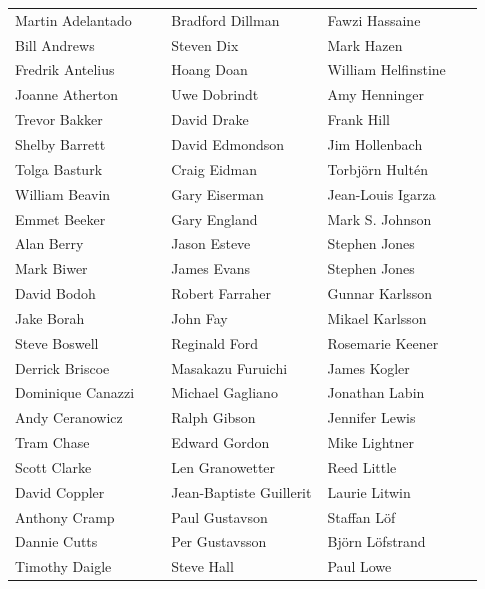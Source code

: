 {\fontsize{8.15}{9.15}\selectfont
\renewcommand{\arraystretch}{0.98}
    \begin{tabular}{@{}Y{0.31\linewidth}Y{0.31\linewidth}Y{0.31\linewidth}@{}}
        Martin Adelantado & Bradford Dillman        & Fawzi Hassaine      \\
        Bill Andrews      & Steven Dix              & Mark Hazen          \\
        Fredrik Antelius  & Hoang Doan              & William Helfinstine \\
        Joanne Atherton   & Uwe Dobrindt            & Amy Henninger       \\
        Trevor Bakker     & David Drake             & Frank Hill          \\
        Shelby Barrett    & David Edmondson         & Jim Hollenbach      \\
        Tolga Basturk     & Craig Eidman            & Torbjörn Hultén     \\
        William Beavin    & Gary Eiserman           & Jean-Louis Igarza   \\
        Emmet Beeker      & Gary England            & Mark S. Johnson     \\
        Alan Berry        & Jason Esteve            & Stephen Jones       \\
        Mark Biwer        & James Evans             & Stephen Jones       \\
        David Bodoh       & Robert Farraher         & Gunnar Karlsson     \\
        Jake Borah        & John Fay                & Mikael Karlsson     \\
        Steve Boswell     & Reginald Ford           & Rosemarie Keener    \\
        Derrick Briscoe   & Masakazu Furuichi       & James Kogler        \\
        Dominique Canazzi & Michael Gagliano        & Jonathan Labin      \\
        Andy Ceranowicz   & Ralph Gibson            & Jennifer Lewis      \\
        Tram Chase        & Edward Gordon           & Mike Lightner       \\
        Scott Clarke      & Len Granowetter         & Reed Little         \\
        David Coppler     & Jean-Baptiste Guillerit & Laurie Litwin       \\
        Anthony Cramp     & Paul Gustavson          & Staffan Löf         \\
        Dannie Cutts      & Per Gustavsson          & Björn Löfstrand     \\
        Timothy Daigle    & Steve Hall              & Paul Lowe           \\
    \end{tabular}}
\endgroup
\clearpage

